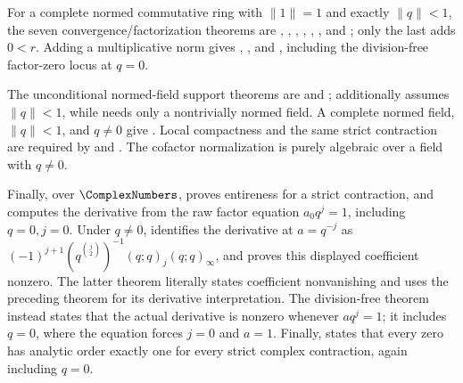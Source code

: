 \documentclass[11pt,a4paper,oneside,openany]{book}
\theoremstyle{definition}
\theoremstyle{remark}
\begin{document}
\begin{itemize}
For a complete normed commutative ring with $\lVert1\rVert=1$ and exactly
$\lVert q\rVert<1$, the seven convergence/factorization theorems are
,
,
,
,
,
, and
; only the last adds $0<r$.
Adding a multiplicative norm gives
,
, and
, including the division-free
factor-zero locus at $q=0$.

The unconditional normed-field support theorems are
 and
;
 additionally assumes
$\lVert q\rVert<1$, while
 needs only a nontrivially
normed field.  A complete normed field, $\lVert q\rVert<1$, and $q\ne0$ give
.  Local compactness
and the same strict contraction are required by
 and
.  The cofactor normalization
 is purely algebraic
over a field with $q\ne0$.

Finally, over $\ComplexNumbers$,
 proves entireness for a strict
contraction, and
 computes the
derivative from the raw factor equation $a_0q^j=1$, including $q=0,j=0$.
Under $q\ne0$,
 identifies the derivative
at $a=q^{-j}$ as
$(-1)^{j+1}(q^{\binom j2})^{-1}(q;q)_j(q;q)_\infty$, and
 proves this displayed
coefficient nonzero.  The latter theorem literally states coefficient
nonvanishing and uses the preceding  theorem for its
derivative interpretation.  The division-free theorem
 instead states
that the actual derivative is nonzero whenever $aq^j=1$; it includes $q=0$,
where the equation forces $j=0$ and $a=1$.  Finally,
 states that every
zero has analytic order exactly one for every strict complex contraction,
again including $q=0$.


\end{itemize}
\end{document}
